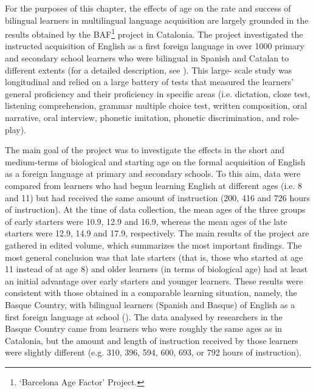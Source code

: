 \documentclass[output=paper,colorlinks,citecolor=brown,nonflat]{../langscibook}
\begin{document}
For the purposes of this chapter, the effects of age on the rate and success of bilingual learners in multilingual language acquisition are largely grounded in the results obtained by the BAF\footnote{ \textrm{‘Barcelona Age Factor’ Project.}} project in Catalonia. The project investigated the instructed acquisition of English as a first foreign language in over 1000 primary and secondary school learners who were bilingual in Spanish and Catalan to different extents (for a detailed description, see \citealt{Muñoz2000}). This large- scale study was longitudinal and relied on a large battery of tests that measured the learners’ general proficiency and their proficiency in specific areas (i.e. dictation, cloze test, listening comprehension, grammar multiple choice test, written composition, oral narrative, oral interview, phonetic imitation, phonetic discrimination, and role-play).

The main goal of the project was to investigate the effects in the short and medium-terms of biological and starting age on the formal acquisition of English as a foreign language at primary and secondary schools. To this aim, data were compared from learners who had begun learning English at different ages (i.e. 8 and 11) but had received the same amount of instruction (200, 416 and 726 hours of instruction). At the time of data collection, the mean ages of the three groups of early starters were 10.9, 12.9 and 16.9, whereas the mean ages of the late starters were 12.9, 14.9 and 17.9, respectively. The main results of the project are gathered in  edited volume, which summarizes the most important findings. The most general conclusion was that late starters (that is, those who started at age 11 instead of at age 8) and older learners (in terms of biological age) had at least an initial advantage over early starters and younger learners. These results were consistent with those obtained in a comparable learning situation, namely, the Basque Country, with bilingual learners (Spanish and Basque) of English as a first foreign language at school (\citealt{García-MayoGarcía-Lecumberri2003}). The data analysed by researchers in the Basque Country came from learners who were roughly the same ages as in Catalonia, but the amount and length of instruction received by those learners were slightly different (e.g. 310, 396, 594, 600, 693, or 792 hours of instruction).
\end{document}
